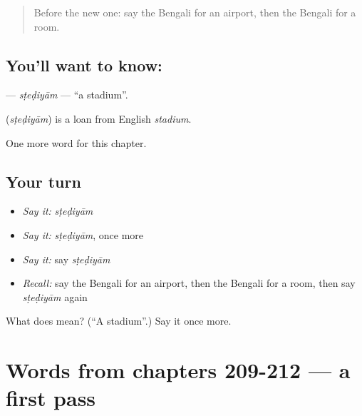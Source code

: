 \label{lesson:BN-C217-stediyam}



\begin{quote}
Before the new one: say the Bengali for an airport, then the Bengali for a room.
\end{quote}

\subsection*{You'll want to know: }
\textbf{} — \emph{sṭeḍiyām} — \textquotedblleft{}a stadium\textquotedblright{}.

\begin{cousinweb}
\textbf{} (\emph{sṭeḍiyām}) is a loan from English \emph{stadium}.
\end{cousinweb}

\begin{grammarlens}[title={What you've built}]
One more word for this chapter.
\end{grammarlens}

\subsection*{Your turn}
\begin{itemize}
\raggedright
  \item \emph{Say it:} \emph{sṭeḍiyām}
  \item \emph{Say it:} \emph{sṭeḍiyām}, once more
  \item \emph{Say it:} say \emph{sṭeḍiyām}
  \item \emph{Recall:} say the Bengali for an airport, then the Bengali for a room, then say \emph{sṭeḍiyām} again
\end{itemize}

\begin{tcolorbox}[breakable,colback=teal!4,colframe=teal!35!black,title={Before you move on}]
What does  mean? (\textquotedblleft{}A stadium\textquotedblright{}.) Say it once more.
\end{tcolorbox}
\section[(dialogue)]{Words from chapters 209-212 — a first pass}

\label{lesson:BN-R217-first-pass-words-from-chapters-209-212}



